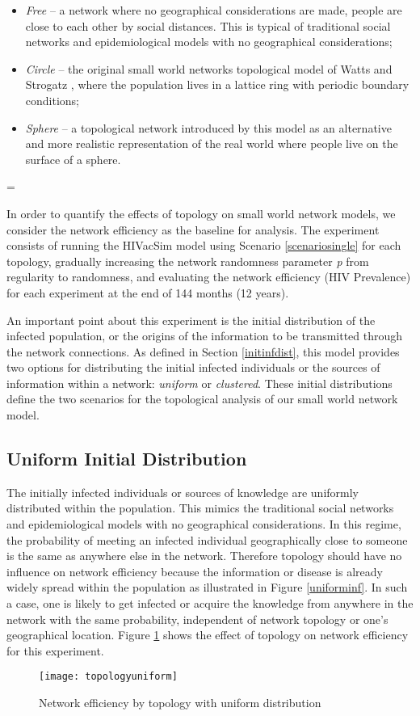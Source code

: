 \parskip=0pt
\begin{itemize}
    \item \emph{Free} -- a network where no geographical considerations are made, people are
    close to each other by social distances. This is typical of traditional social
    networks and epidemiological models with no geographical considerations;
    \item \emph{Circle} -- the original small world networks topological model of Watts and
    Strogatz \cite{Watts1998}, where the population lives in a lattice ring with
    periodic boundary conditions;
    \item \emph{Sphere} -- a topological network introduced by this model as an alternative
    and more realistic representation of the real world where people live on the surface
    of a sphere.
\end{itemize}
\parskip=\baselineskip

In order to quantify the effects of topology on small world network models, we consider
the network efficiency as the baseline for analysis. The experiment consists of running
the HIVacSim model using Scenario \ref{scenariosingle} for each topology, gradually
increasing the network randomness parameter \emph{p} from regularity to randomness, and
evaluating the network efficiency (HIV Prevalence) for each experiment at the end of 144
months (12 years).

An important point about this experiment is the initial distribution of the infected
population, or the origins of the information to be transmitted through the network
connections. As defined in Section \ref{initinfdist}, this model provides two options for
distributing the initial infected individuals or the sources of information within a
network: \emph{uniform} or \emph{clustered}. These initial distributions define the two
scenarios for the topological analysis of our small world network model.

\subsection{Uniform Initial Distribution}

The initially infected individuals or sources of knowledge are uniformly distributed
within the population. This mimics the traditional social networks and epidemiological
models with no geographical considerations. In this regime, the probability of meeting an
infected individual geographically close to someone is the same as anywhere else in the
network. Therefore topology should have no influence on network efficiency because the
information or disease is already widely spread within the population as illustrated in
Figure \ref{uniforminf}. In such a case, one is likely to get infected or acquire the
knowledge from anywhere in the network with the same probability, independent of network
topology or one's geographical location. Figure \ref{topologyuniform} shows the effect of
topology on network efficiency for this experiment.
\begin{figure}[h]
\texttt{[image: topologyuniform]}
\caption{Network efficiency by topology with uniform distribution}
\label{topologyuniform}
\end{figure}

